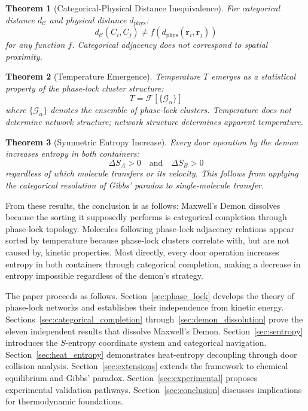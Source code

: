 \documentclass[12pt,a4paper]{article}
\newtheorem{theorem}{Theorem}[section]
\theoremstyle{definition}
\theoremstyle{remark}
\newcommand{\phaselockgraph}{\mathcal{G}}
\newcommand{\catspace}{\mathcal{C}}
\begin{document}
\begin{theorem}[Categorical-Physical Distance Inequivalence]
\label{thm:distance_inequivalence_intro}
For categorical distance $d_{\catspace}$ and physical distance $d_{\text{phys}}$:
\begin{equation}
d_{\catspace}(C_i, C_j) \neq f(d_{\text{phys}}(\mathbf{r}_i, \mathbf{r}_j))
\end{equation}
for any function $f$. Categorical adjacency does not correspond to spatial proximity.
\end{theorem}

\begin{theorem}[Temperature Emergence]
\label{thm:temperature_emergence_intro}
Temperature $T$ emerges as a statistical property of the phase-lock cluster structure:
\begin{equation}
T = \mathcal{F}[\{\phaselockgraph_\alpha\}]
\end{equation}
where $\{\phaselockgraph_\alpha\}$ denotes the ensemble of phase-lock clusters. Temperature does not determine network structure; network structure determines apparent temperature.
\end{theorem}

\begin{theorem}[Symmetric Entropy Increase]
\label{thm:symmetric_entropy_intro}
Every door operation by the demon increases entropy in both containers:
\begin{equation}
\Delta S_A > 0 \quad \text{and} \quad \Delta S_B > 0
\end{equation}
regardless of which molecule transfers or its velocity. This follows from applying the categorical resolution of Gibbs' paradox to single-molecule transfer.
\end{theorem}

From these results, the conclusion is as follows: Maxwell's Demon dissolves because the sorting it supposedly performs is categorical completion through phase-lock topology. Molecules following phase-lock adjacency relations appear sorted by temperature because phase-lock clusters correlate with, but are not caused by, kinetic properties. Most directly, every door operation increases entropy in both containers through categorical completion, making a decrease in entropy impossible regardless of the demon's strategy.

The paper proceeds as follows. Section~\ref{sec:phase_lock} develops the theory of phase-lock networks and establishes their independence from kinetic energy. Sections~\ref{sec:categorical_completion} through~\ref{sec:demon_dissolution} prove the eleven independent results that dissolve Maxwell's Demon. Section~\ref{sec:sentropy} introduces the $S$-entropy coordinate system and categorical navigation. Section~\ref{sec:heat_entropy} demonstrates heat-entropy decoupling through door collision analysis. Section~\ref{sec:extensions} extends the framework to chemical equilibrium and Gibbs' paradox. Section~\ref{sec:experimental} proposes experimental validation pathways. Section~\ref{sec:conclusion} discusses implications for thermodynamic foundations.
\end{document}
